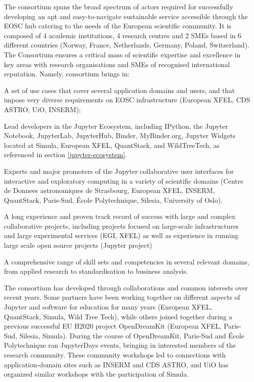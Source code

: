 The \TheProject consortium spans the broad spectrum of actors required
for successfully developing an apt and easy-to-navigate sustainable service
accessible through the EOSC hub catering to the needs of the European
scientific community. It is composed of 4 academic institutions, 4 research
centres and 2 SMEs based in 6 different countries (Norway, France,
Netherlands, Germany, Poland, Switzerland).
The Consortium ensures a critical mass of scientific expertise and excellence
in key areas  with research organisations and SMEs of recognised
 international reputation. Namely, \TheProject consortium brings in:
\begin{compactitem}
\item A set of use cases that cover several application domains and users, and that impose very diverse
requirements on EOSC infrastructure (European XFEL, CDS ASTRO, UiO, INSERM);
\item Lead developers in the Jupyter Ecosystem, including IPython, the Jupyter Notebook, JupyterLab,
JupyterHub, Binder, MyBinder.org, Jupyter Widgets located at Simula, European XFEL, QuantStack, and
WildTreeTech,
as referenced in section \ref{jupyter-ecosystem}.
\item Experts and major promoters of the Jupyter collaborative user interfaces for interactive and exploratory
computing in a variety of scientific domains (Centre de Donnees
astronomiques de Strasbourg, European XFEL,
INSERM, QuantStack, Paris-Sud, \'Ecole Polytechnique, Silesia,
University of Oslo).
\item A long experience and proven track record of success with large and complex collaborative projects,
including projects focused on large-scale infrastructures and large experimental services (EGI, XFEL) as well
as experience in running large scale open source projects (Jupyter project)
\item A comprehensive range of skill sets and competencies in several relevant domains, from applied
research to standardisation to business
analysis.
\end{compactitem}

The consortium has developed through collaborations and common interests over recent years.
Some partners have been working together on different aspects of Jupyter
and software for education for many years (European XFEL, QuantStack, Simula, Wild Tree Tech),
while others joined together during a previous successful EU H2020 project OpenDreamKit (European XFEL,
Paris-Sud, Silesia, Simula).
During the course of OpenDreamKit, Paris-Sud and \'Ecole Polytechnique
ran JupyterDays events, bringing in interested members of the research community.
These community workshops led to connections with application-domain sites such as INSERM and CDS
ASTRO,
and UiO has organized similar workshops with the participation of Simula.

